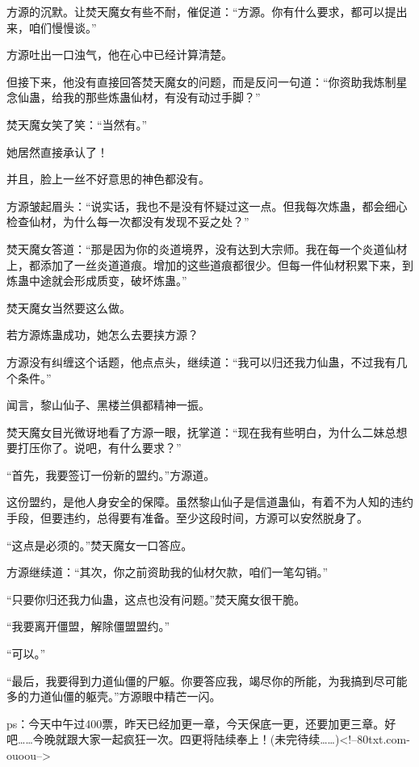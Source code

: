 \begin{this_body}
方源的沉默。让焚天魔女有些不耐，催促道：“方源。你有什么要求，都可以提出来，咱们慢慢谈。”

方源吐出一口浊气，他在心中已经计算清楚。

但接下来，他没有直接回答焚天魔女的问题，而是反问一句道：“你资助我炼制星念仙蛊，给我的那些炼蛊仙材，有没有动过手脚？”

焚天魔女笑了笑：“当然有。”

她居然直接承认了！

并且，脸上一丝不好意思的神色都没有。

方源皱起眉头：“说实话，我也不是没有怀疑过这一点。但我每次炼蛊，都会细心检查仙材，为什么每一次都没有发现不妥之处？”

焚天魔女答道：“那是因为你的炎道境界，没有达到大宗师。我在每一个炎道仙材上，都添加了一丝炎道道痕。增加的这些道痕都很少。但每一件仙材积累下来，到炼蛊中途就会形成质变，破坏炼蛊。”

焚天魔女当然要这么做。

若方源炼蛊成功，她怎么去要挟方源？

方源没有纠缠这个话题，他点点头，继续道：“我可以归还我力仙蛊，不过我有几个条件。”

闻言，黎山仙子、黑楼兰俱都精神一振。

焚天魔女目光微讶地看了方源一眼，抚掌道：“现在我有些明白，为什么二妹总想要打压你了。说吧，有什么要求？”

“首先，我要签订一份新的盟约。”方源道。

这份盟约，是他人身安全的保障。虽然黎山仙子是信道蛊仙，有着不为人知的违约手段，但要违约，总得要有准备。至少这段时间，方源可以安然脱身了。

“这点是必须的。”焚天魔女一口答应。

方源继续道：“其次，你之前资助我的仙材欠款，咱们一笔勾销。”

“只要你归还我力仙蛊，这点也没有问题。”焚天魔女很干脆。

“我要离开僵盟，解除僵盟盟约。”

“可以。”

“最后，我要得到力道仙僵的尸躯。你要答应我，竭尽你的所能，为我搞到尽可能多的力道仙僵的躯壳。”方源眼中精芒一闪。

ps：今天中午过400票，昨天已经加更一章，今天保底一更，还要加更三章。好吧……今晚就跟大家一起疯狂一次。四更将陆续奉上！(未完待续……)<!--80txt.com-ouoou-->

\end{this_body}

